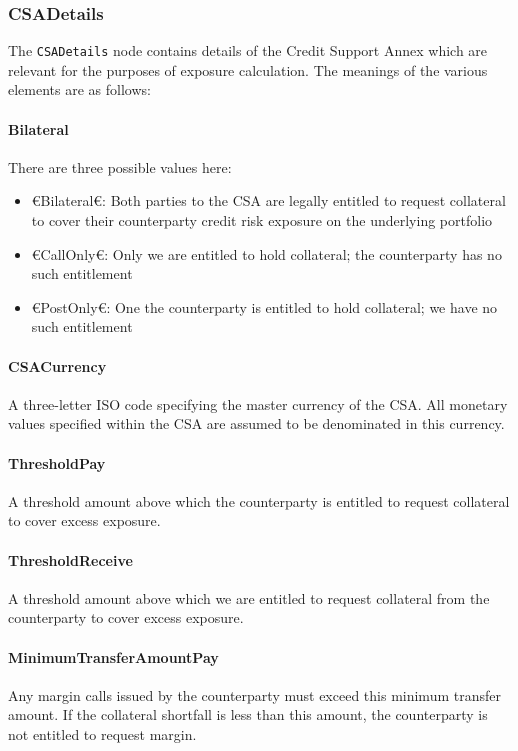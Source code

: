 \subsubsection{CSADetails}

The \lstinline!CSADetails! node contains details of the Credit Support
Annex which are relevant for the purposes of exposure calculation. The
meanings of the various elements are as follows:

\paragraph{Bilateral} There are three possible values here:
\begin{itemize}
\item €Bilateral€: Both parties to the CSA are legally entitled to
  request collateral to cover their counterparty credit risk exposure
  on the underlying portfolio
\item €CallOnly€: Only we are entitled to hold collateral; the
  counterparty has no such entitlement
\item €PostOnly€: One the counterparty is entitled to hold collateral;
  we have no such entitlement
\end{itemize}

\paragraph{CSACurrency} A three-letter ISO code specifying the master
currency of the CSA. All monetary values specified within the CSA are
assumed to be denominated in this currency.

\paragraph{ThresholdPay} A threshold amount above which the
counterparty is entitled to request collateral to cover excess
exposure.

\paragraph{ThresholdReceive} A threshold amount above which we are
entitled to request collateral from the counterparty to cover excess
exposure.

\paragraph{MinimumTransferAmountPay} Any margin calls issued by the
counterparty must exceed this minimum transfer amount. If the
collateral shortfall is less than this amount, the counterparty is not
entitled to request margin.

